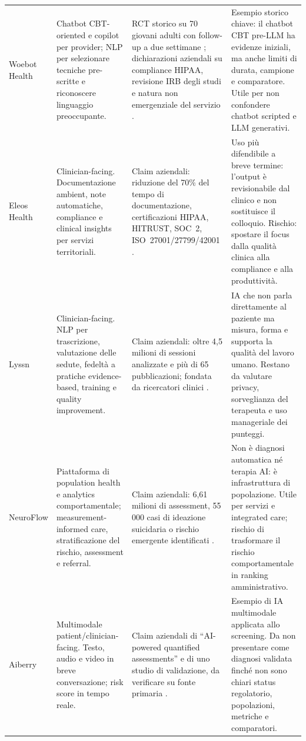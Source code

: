 \documentclass[11pt,a4paper]{article}
\begin{document}
\begin{longtable}{>{\RaggedRight}p{2.2cm} >{\RaggedRight}p{3.4cm} >{\RaggedRight}p{4.0cm} >{\RaggedRight}p{4.0cm}}
\addlinespace
\small Woebot Health & \small Chatbot CBT-oriented e copilot per provider; NLP per selezionare tecniche pre-scritte e riconoscere linguaggio preoccupante. & \small RCT storico su 70 giovani adulti con follow-up a due settimane \cite{fitzpatrick2017}; dichiarazioni aziendali su compliance HIPAA, revisione IRB degli studi e natura non emergenziale del servizio \cite{woebot}. & \small Esempio storico chiave: il chatbot CBT pre-LLM ha evidenze iniziali, ma anche limiti di durata, campione e comparatore. Utile per non confondere chatbot scripted e LLM generativi. \\
\addlinespace
\small Eleos Health & \small Clinician-facing. Documentazione ambient, note automatiche, compliance e clinical insights per servizi territoriali. & \small Claim aziendali: riduzione del 70\% del tempo di documentazione, certificazioni HIPAA, HITRUST, SOC~2, ISO~27001/27799/42001 \cite{eleos}. & \small Uso più difendibile a breve termine: l'output è revisionabile dal clinico e non sostituisce il colloquio. Rischio: spostare il focus dalla qualità clinica alla compliance e alla produttività. \\
\addlinespace
\small Lyssn & \small Clinician-facing. NLP per trascrizione, valutazione delle sedute, fedeltà a pratiche evidence-based, training e quality improvement. & \small Claim aziendali: oltre 4,5 milioni di sessioni analizzate e più di 65 pubblicazioni; fondata da ricercatori clinici \cite{lyssn}. & \small IA che non parla direttamente al paziente ma misura, forma e supporta la qualità del lavoro umano. Restano da valutare privacy, sorveglianza del terapeuta e uso manageriale dei punteggi. \\
\addlinespace
\small NeuroFlow & \small Piattaforma di population health e analytics comportamentale; measurement-informed care, stratificazione del rischio, assessment e referral. & \small Claim aziendali: 6,61 milioni di assessment, 55\,000 casi di ideazione suicidaria o rischio emergente identificati \cite{neuroflow}. & \small Non è diagnosi automatica né terapia AI: è infrastruttura di popolazione. Utile per servizi e integrated care; rischio di trasformare il rischio comportamentale in ranking amministrativo. \\
\addlinespace
\small Aiberry & \small Multimodale patient/clinician-facing. Testo, audio e video in breve conversazione; risk score in tempo reale. & \small Claim aziendali di ``AI-powered quantified assessments'' e di uno studio di validazione, da verificare su fonte primaria \cite{aiberry}. & \small Esempio di IA multimodale applicata allo screening. Da non presentare come diagnosi validata finché non sono chiari status regolatorio, popolazioni, metriche e comparatori. \\

\end{longtable}
\end{document}
